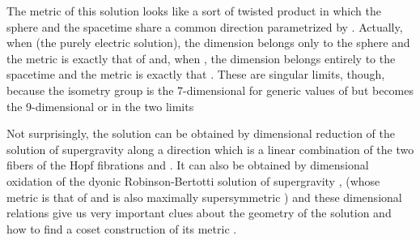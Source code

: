 \documentclass[12pt,a4paper]{article}
\begin{document}
The metric of this solution looks like a sort of twisted product
\coordHE{} in which the sphere and the \coordHE{} spacetime
share a common direction parametrized by \myHighlight{$\psi$}\coordHE{}. Actually, when
\coordHE{} (the purely electric solution), the dimension \myHighlight{$\psi$}\coordHE{}
belongs only to the sphere and the metric is exactly that of
\coordHE{} and, when \coordHE{}, the dimension \myHighlight{$\psi$}\coordHE{}
belongs entirely to the \coordHE{} spacetime and the metric is exactly that
\coordHE{}. These are singular limits, though, because the
isometry group is the 7-dimensional \coordHE{}
for generic values of \myHighlight{$\cos{\alpha}$}\coordHE{} but becomes the 9-dimensional
\coordHE{} or \coordHE{} in the two limits

Not surprisingly, the solution can be obtained by dimensional
reduction of the \coordHE{} solution of \coordHE{}
supergravity along a direction which is a linear combination of the
two \coordHE{} fibers of the Hopf fibrations
\coordHE{} and
\coordHE{}
\cite{Lozano-Tellechea:2002pn}.  It can also be obtained by
dimensional oxidation of the dyonic Robinson-Bertotti solution
\cite{kn:Rob,kn:Bert} of \coordHE{} supergravity
\cite{Lozano-Tellechea:2002pn}, (whose metric is that of
\coordHE{} and is also maximally supersymmetric
\cite{Gibbons:1984kp,Kallosh:1992gu}) and these dimensional relations
give us very important clues about the geometry of the solution and
how to find a coset construction of its metric \cite{Coquereaux:ne}.
\end{document}
